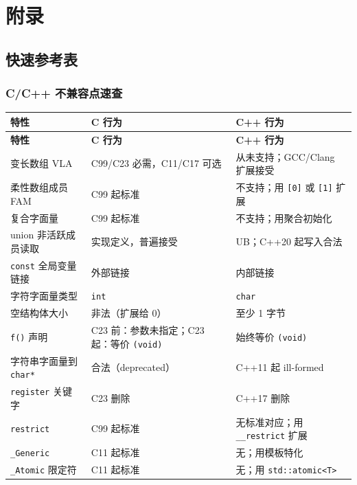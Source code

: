 \documentclass[12pt,a4paper,fontset=fandol]{ctexbook}
\newcommand{\kw}[1]{\texttt{#1}}
\begin{document}
\part{附录}

\chapter{快速参考表}

\section{C/C++ 不兼容点速查}

\small
\setlength{\tabcolsep}{4pt}
\begin{longtable}{@{}>{\raggedright\arraybackslash}p{4.5cm} >{\raggedright\arraybackslash}p{5.0cm} >{\raggedright\arraybackslash}p{5.0cm}@{}}
\toprule
\textbf{特性} & \textbf{C 行为} & \textbf{C++ 行为} \\
\midrule
\endfirsthead
\toprule
\textbf{特性} & \textbf{C 行为} & \textbf{C++ 行为} \\
\midrule
\endhead
\bottomrule
\endfoot
变长数组 VLA & C99/C23 必需，C11/C17 可选 & 从未支持；GCC/Clang 扩展接受 \\
柔性数组成员 FAM & C99 起标准 & 不支持；用 \kw{[0]} 或 \kw{[1]} 扩展 \\
复合字面量 & C99 起标准 & 不支持；用聚合初始化 \\
union 非活跃成员读取 & 实现定义，普遍接受 & UB；C++20 起写入合法 \\
\kw{const} 全局变量链接 & 外部链接 & 内部链接 \\
字符字面量类型 & \kw{int} & \kw{char} \\
空结构体大小 & 非法（扩展给 0） & 至少 1 字节 \\
\kw{f()} 声明 & C23 前：参数未指定；C23 起：等价 \kw{(void)} & 始终等价 \kw{(void)} \\
字符串字面量到 \kw{char*} & 合法（deprecated） & C++11 起 ill-formed \\
\kw{register} 关键字 & C23 删除 & C++17 删除 \\
\kw{restrict} & C99 起标准 & 无标准对应；用 \kw{\_\_restrict} 扩展 \\
\kw{\_Generic} & C11 起标准 & 无；用模板特化 \\
\kw{\_Atomic} 限定符 & C11 起标准 & 无；用 \kw{std::atomic<T>} \\

\end{longtable}
\end{document}
